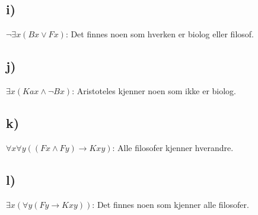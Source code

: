 \documentclass[a4paper, norsk, 10pt]{article}
\begin{document}
\begin{flushleft}
  \subsection*{i)}
  $\neg \exists x(Bx \lor Fx)$: \quad Det finnes noen som hverken er biolog eller filosof.
  
  \subsection*{j)}
  $\exists x (Kax \land \neg Bx)$: \quad Aristoteles kjenner noen som ikke er biolog. 
  
  \subsection*{k)}
  $\forall x \forall y ((Fx \land Fy) \rightarrow Kxy) $: \quad Alle filosofer kjenner hverandre.
  
  \subsection*{l)}
  $\exists x( \forall y (Fy \rightarrow Kxy))$: \quad Det finnes noen som kjenner alle filosofer.
  


\end{flushleft}
\end{document}
